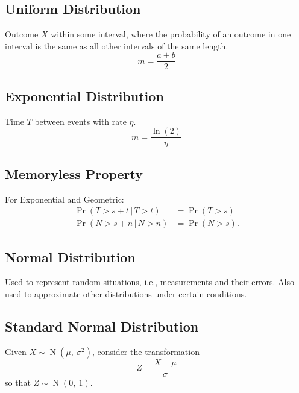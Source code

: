\documentclass{article}
\begin{document}
\begin{minipage}{62.39259259mm}
    \subsection{Uniform Distribution}
    Outcome \(X\) within some interval, where the probability of an outcome in one interval is the same as all other intervals of the same length.
    \begin{equation*}
        m = \frac{a + b}{2}
    \end{equation*}
    \subsection{Exponential Distribution}
    Time \(T\) between events with rate \(\eta\).
    \begin{equation*}
        m = \frac{\ln{\left( 2 \right)}}{\eta}
    \end{equation*}
    \subsection{Memoryless Property}
    For Exponential and Geometric:
    \begin{align*}
        \Pr{\left( T > s + t \,\vert\, T > t \right)} & = \Pr{\left( T > s \right)}  \\
        \Pr{\left( N > s + n \,\vert\, N > n \right)} & = \Pr{\left( N > s \right)}.
    \end{align*}
    \subsection{Normal Distribution}
    Used to represent random situations, i.e., measurements and their errors.
    Also used to approximate other distributions under certain conditions.
    \subsection{Standard Normal Distribution}
    Given \(X \sim \operatorname{N}{\left( \mu,\: \sigma^2 \right)}\), consider the transformation
    \begin{equation*}
        Z = \frac{X - \mu}{\sigma}
    \end{equation*}
    so that \(Z \sim \operatorname{N}{\left( 0,\: 1 \right)}\).
\end{minipage}\hfill%
\end{document}
